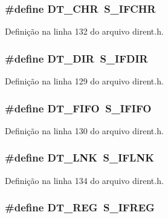 \subsubsection[{D\+T\+\_\+\+C\+HR}]{\setlength{\rightskip}{0pt plus 5cm}\#define D\+T\+\_\+\+C\+HR~{\bf S\+\_\+\+I\+F\+C\+HR}}\label{dirent_8h_a7d0095c3caf2c334bf222608d02576d7}


Definição na linha 132 do arquivo dirent.\+h.

\subsubsection[{D\+T\+\_\+\+D\+IR}]{\setlength{\rightskip}{0pt plus 5cm}\#define D\+T\+\_\+\+D\+IR~{\bf S\+\_\+\+I\+F\+D\+IR}}\label{dirent_8h_a1dcee67486bc4238096ecb61e2d9ffd1}


Definição na linha 129 do arquivo dirent.\+h.

\subsubsection[{D\+T\+\_\+\+F\+I\+FO}]{\setlength{\rightskip}{0pt plus 5cm}\#define D\+T\+\_\+\+F\+I\+FO~{\bf S\+\_\+\+I\+F\+I\+FO}}\label{dirent_8h_a6fabe696c35bf34daa67931b4c245c7d}


Definição na linha 130 do arquivo dirent.\+h.

\subsubsection[{D\+T\+\_\+\+L\+NK}]{\setlength{\rightskip}{0pt plus 5cm}\#define D\+T\+\_\+\+L\+NK~{\bf S\+\_\+\+I\+F\+L\+NK}}\label{dirent_8h_aa70b5cb1d9c30b1830cb6a5e835231c6}


Definição na linha 134 do arquivo dirent.\+h.

\subsubsection[{D\+T\+\_\+\+R\+EG}]{\setlength{\rightskip}{0pt plus 5cm}\#define D\+T\+\_\+\+R\+EG~{\bf S\+\_\+\+I\+F\+R\+EG}}\label{dirent_8h_a9973595cf6775b1b29d7274ab4c0d623}



